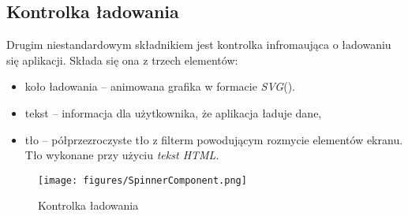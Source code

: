 \subsection{Kontrolka ładowania}
Drugim niestandardowym składnikiem jest kontrolka infromaująca o ładowaniu się aplikacji. Składa się ona z trzech elementów:
\begin{itemize}
    \item koło ładowania -- animowana grafika w formacie \emph{SVG}().
    \item tekst -- informacja dla użytkownika, że aplikacja ładuje dane,
        \item tło -- półprzezroczyste tło z filterm powodującym rozmycie elementów ekranu. Tło wykonane przy użyciu \emph{tekst HTML}.
\end{itemize}

\begin{figure}[t]
    \centering
    \texttt{[image: figures/SpinnerComponent.png]}
    \caption{Kontrolka ładowania} 
    \label{fig:spinnercomponent}
    \end{figure}

